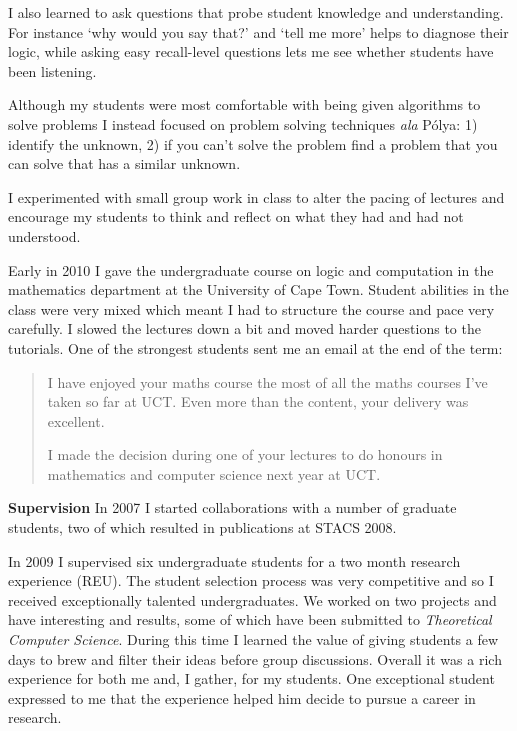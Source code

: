 \documentclass[12pt]{article}
\theoremstyle{plain} \numberwithin{equation}{section}
\theoremstyle{definition}
\begin{document}
I also learned to ask questions that probe student knowledge and understanding. For instance `why would you say that?' and `tell me more' helps to diagnose their logic, while asking easy recall-level questions lets me see whether students have been listening.

Although my students were most comfortable with being given algorithms to solve problems I instead focused on problem solving techniques {\it ala} P\'olya: 1) identify the unknown, 2) if you can't solve the problem find a problem that you can solve that has a similar unknown. 

I experimented with small group work in class to alter the pacing of lectures and encourage my students to think and reflect on what they had and had not understood.


Early in 2010 I gave the undergraduate course on logic and computation in the mathematics department at the University of Cape Town. Student abilities in the class were very mixed which meant I had to structure the course and pace very carefully. I slowed the lectures down a bit and moved harder questions to the tutorials. One of the strongest students sent me an email at the end of the term:
\begin{quote}
I have enjoyed your maths course the most of all the maths courses I've taken so far at UCT. Even more than the content, your delivery was excellent.

I made the decision during one of your lectures to do honours in mathematics and computer science next year at UCT. 
\end{quote}

{\bf Supervision}
In 2007 I started collaborations with a number of graduate students, two of which resulted in publications at STACS 2008.

In 2009 I supervised six undergraduate students for a two month research experience (REU). The student selection process was very competitive and so I received exceptionally talented undergraduates.
We worked on two projects and have interesting and results, some of which have been submitted to {\em Theoretical Computer Science}. During this time I learned the value of giving students a few days to brew and filter their ideas before group discussions.
Overall it was a rich experience for both me and, I gather, for my students. One exceptional student expressed to me that the experience helped him decide to pursue a career in research.
\end{document}
